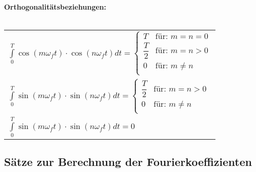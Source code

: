 		\begin{minipage}[t]{0.5\textwidth}
			\textbf{Orthogonalitätsbeziehungen:\\[1pt]}\\[3pt]
			\renewcommand{\arraystretch}{1.7}
				\begin{tabular}{|l|}
					\hline
					$\displaystyle \int\limits_{0}^{T} \cos(m \omega_f t) \cdot \cos(n \omega_f t) dt = \left\lbrace 
						\begin{array}{ll}
							T & \text{für: } m = n = 0\\
							\dfrac{T}{2} & \text{für: } m = n > 0\\
							0 & \text{für: } m \neq n\\
						\end{array} \right.$\\[3pt]
					$\displaystyle \int\limits_{0}^{T} \sin(m \omega_f t) \cdot \sin(n \omega_f t) dt = \left\lbrace 
						\begin{array}{ll}
							\dfrac{T}{2} & \text{für: } m = n > 0\\
							0 & \text{für: } m \neq n\\
						\end{array} \right.$\\[3pt]
					$\displaystyle \int\limits_{0}^{T} \sin(m \omega_f t) \cdot \sin(n \omega_f t) dt = 0$\\[3pt]
					\hline
				\end{tabular}
			\renewcommand{\arraystretch}{1}
		\end{minipage}
	
	\subsection{Sätze zur Berechnung der Fourierkoeffizienten}
